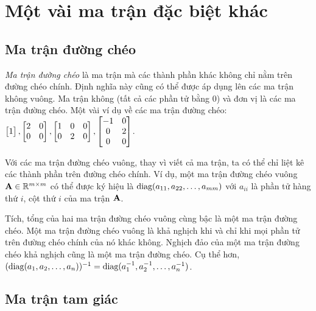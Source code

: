\section{Một vài ma trận đặc biệt khác} %
\label{sec:mot_vai_ma_tran_dac_biet_khac}

\subsection{Ma trận đường chéo} %
\label{sub:ma_tran_duong_cheo}



\textit{Ma trận đường chéo} là ma trận mà các thành phần khác không chỉ nằm trên
đường chéo chính. Định nghĩa này cũng có thể được áp dụng lên các ma trận không
vuông. Ma trận không (tất cả các phần tử bằng 0) và đơn vị là các ma trận đường
chéo. Một vài ví dụ về các ma trận đường chéo:%
$\left[\begin{matrix} 1 \end{matrix}\right], \left[\begin{matrix} 2 & 0 \\ 0 & 0 \end{matrix}\right], \left[\begin{matrix} 1 & 0 & 0 \\ 0 &2 & 0 \end{matrix}\right], \left[\begin{matrix}
-1 & 0 \\ 0 & 2 \\ 0 & 0  \end{matrix}\right]$.

Với các ma trận đường chéo vuông, thay vì viết cả ma trận, ta có thể chỉ liệt kê
các thành phần trên đường chéo chính. Ví dụ, một ma trận đường chéo vuông $\mathbf{A}\in
\mathbb{R}^{m\times m}$ có thể được ký hiệu là $\text{diag}(a_{11}, a_{22}, \dots, a_{mm})$
với $a_{ii}$
là phần tử hàng thứ $i$, cột thứ $i$ của ma trận $\mathbf{A}$.

Tích, tổng của hai ma trận đường chéo vuông cùng bậc là một ma trận đường chéo.
Một ma trận đường chéo vuông là khả nghịch khi và chỉ khi mọi phần tử trên đường
chéo chính của nó khác không. Nghịch đảo của một ma trận đường chéo khả nghịch
cũng là một ma trận đường chéo. Cụ thể hơn, $(\text{diag}(a_1, a_2, \dots, a_n))^{-1}
= \text{diag}(a_1^{-1}, a_2^{-1}, \dots, a_n^{-1})$.%


\subsection{Ma trận tam giác} %
\label{sub:ma_tran_tam_giac}


